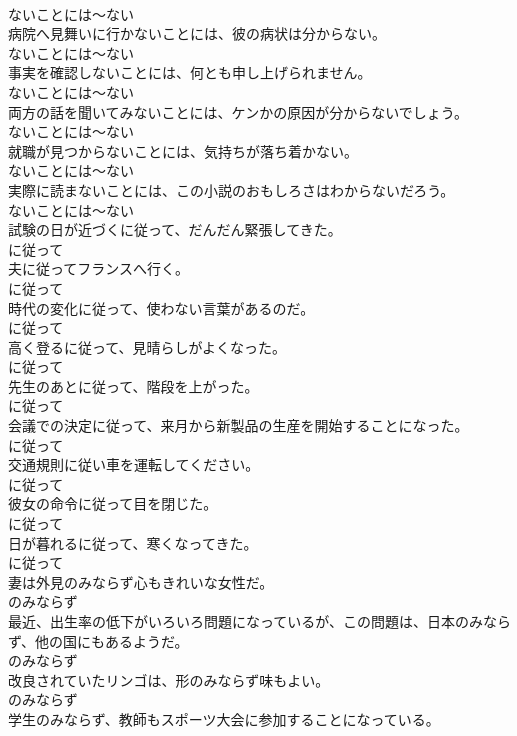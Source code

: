 \documentclass[8pt]{extreport}
\begin{document}
\begin{CJK}{UTF8}{min}
\\	ないことには～ない
\\	病院へ見舞いに行かないことには、彼の病状は分からない。	
\\	ないことには～ない
\\	事実を確認しないことには、何とも申し上げられません。	
\\	ないことには～ない
\\	両方の話を聞いてみないことには、ケンかの原因が分からないでしょう。	
\\	ないことには～ない
\\	就職が見つからないことには、気持ちが落ち着かない。	
\\	ないことには～ない
\\	実際に読まないことには、この小説のおもしろさはわからないだろう。	
\\	ないことには～ない
\\	試験の日が近づくに従って、だんだん緊張してきた。	
\\	に従って
\\	夫に従ってフランスへ行く。	
\\	に従って
\\	時代の変化に従って、使わない言葉があるのだ。	
\\	に従って
\\	高く登るに従って、見晴らしがよくなった。	
\\	に従って
\\	先生のあとに従って、階段を上がった。	
\\	に従って
\\	会議での決定に従って、来月から新製品の生産を開始することになった。	
\\	に従って
\\	交通規則に従い車を運転してください。	
\\	に従って
\\	彼女の命令に従って目を閉じた。	
\\	に従って
\\	日が暮れるに従って、寒くなってきた。	
\\	に従って
\\	妻は外見のみならず心もきれいな女性だ。	
\\	のみならず
\\	最近、出生率の低下がいろいろ問題になっているが、この問題は、日本のみならず、他の国にもあるようだ。	
\\	のみならず
\\	改良されていたリンゴは、形のみならず味もよい。	
\\	のみならず
\\	学生のみならず、教師もスポーツ大会に参加することになっている。	

\end{CJK}
\end{document}
